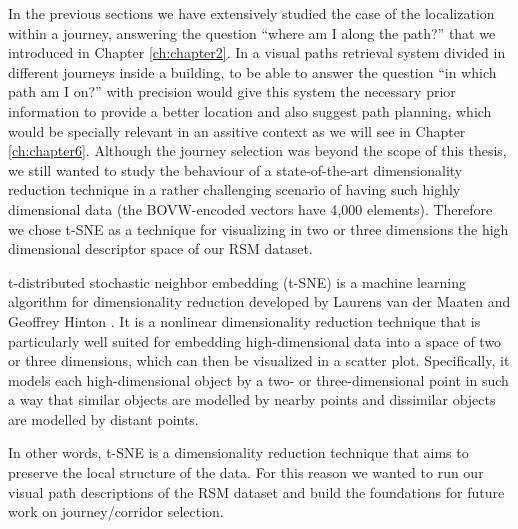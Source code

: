 In the previous sections we have extensively studied the case of the localization within a journey, answering the question ``where am I along the path?'' that we introduced in Chapter \ref{ch:chapter2}. In a visual paths retrieval system divided in different journeys inside a building, to be able to answer the question ``in which path am I on?'' with precision would give this system the necessary prior information to provide a better location and also suggest path planning, which would be specially relevant in an assitive context as we will see in Chapter \ref{ch:chapter6}. Although the journey selection was beyond the scope of this thesis, we still wanted to study the behaviour of a state-of-the-art dimensionality reduction technique in a rather challenging scenario of having such highly dimensional data (the BOVW-encoded vectors have 4,000 elements). Therefore we chose t-SNE as a technique for visualizing in two or three dimensions the high dimensional descriptor space of our RSM dataset.

t-distributed stochastic neighbor embedding (t-SNE) is a machine learning algorithm for dimensionality reduction developed by Laurens van der Maaten and Geoffrey Hinton \cite{maaten2009learning}. It is a nonlinear dimensionality reduction technique that is particularly well suited for embedding high-dimensional data into a space of two or three dimensions, which can then be visualized in a scatter plot. Specifically, it models each high-dimensional object by a two- or three-dimensional point in such a way that similar objects are modelled by nearby points and dissimilar objects are modelled by distant points.

In other words, t-SNE is a dimensionality reduction technique that aims to preserve the local structure of the data. For this reason we wanted to run our visual path descriptions of the RSM dataset and build the foundations for future work on journey/corridor selection.


